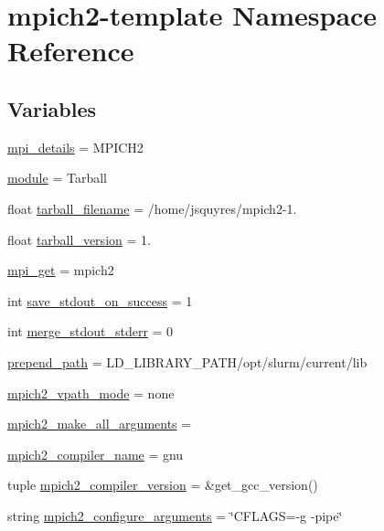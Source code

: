 \hypertarget{namespacempich2-template}{\section{mpich2-\/template Namespace Reference}
\label{namespacempich2-template}
}
\subsection*{Variables}
\begin{DoxyCompactItemize}
\item 
\hyperlink{namespacempich2-template_a6b1b1f5d25476fbca270d0985d661274}{mpi\-\_\-details} = M\-P\-I\-C\-H2
\item 
\hyperlink{namespacempich2-template_abea5cd73818946f1fc5576eaa63c349e}{module} = Tarball
\item 
float \hyperlink{namespacempich2-template_aa946b9eaec8fb25af4f03c7271804090}{tarball\-\_\-filename} = /home/jsquyres/mpich2-\/1.
\item 
float \hyperlink{namespacempich2-template_a7ae4515fd7f67881d2edc4db6b0c4199}{tarball\-\_\-version} = 1.
\item 
\hyperlink{namespacempich2-template_adbf06848cfab6ca7c02c6403132c0139}{mpi\-\_\-get} = mpich2
\item 
int \hyperlink{namespacempich2-template_aae7d34e11fae16b68e0cfd32f9b32044}{save\-\_\-stdout\-\_\-on\-\_\-success} = 1
\item 
int \hyperlink{namespacempich2-template_a473952e84102b337ba25c3d8607f4f4f}{merge\-\_\-stdout\-\_\-stderr} = 0
\item 
\hyperlink{namespacempich2-template_a6a8f9d4e233a444b8ec50c48c62fc4e4}{prepend\-\_\-path} = L\-D\-\_\-\-L\-I\-B\-R\-A\-R\-Y\-\_\-\-P\-A\-T\-H/opt/slurm/current/lib
\item 
\hyperlink{namespacempich2-template_a0f5c02d35394fb0540d3ec8d2d291edf}{mpich2\-\_\-vpath\-\_\-mode} = none
\item 
\hyperlink{namespacempich2-template_a46562d5738a372655d9a055eb0feffe5}{mpich2\-\_\-make\-\_\-all\-\_\-arguments} =
\item 
\hyperlink{namespacempich2-template_a65f102a602ca4727a803a9fd360d25a6}{mpich2\-\_\-compiler\-\_\-name} = gnu
\item 
tuple \hyperlink{namespacempich2-template_a74f41ead1e75cba3e87a1c2901517c19}{mpich2\-\_\-compiler\-\_\-version} = \&get\-\_\-gcc\-\_\-version()
\item 
string \hyperlink{namespacempich2-template_a4d2aaae7e07592dc3fce0b0d1b64e1ad}{mpich2\-\_\-configure\-\_\-arguments} = \char`\"{}C\-F\-L\-A\-G\-S=-\/g -\/pipe\char`\"{}

\end{DoxyCompactItemize}
